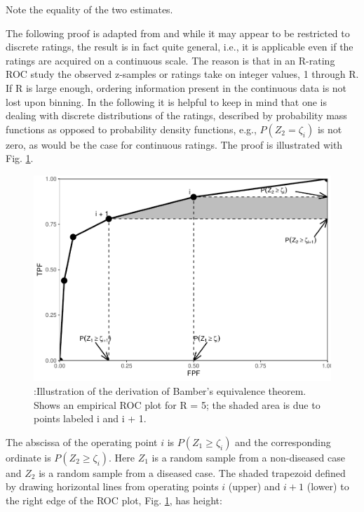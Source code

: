 \documentclass[
]{book}
\begin{document}
Note the equality of the two estimates.

The following proof is adapted from \citep{RN2174} and while it may appear to be restricted to discrete ratings, the result is in fact quite general, i.e., it is applicable even if the ratings are acquired on a continuous scale. The reason is that in an R-rating ROC study the observed z-samples or ratings take on integer values, 1 through R. If R is large enough, ordering information present in the continuous data is not lost upon binning. In the following it is helpful to keep in mind that one is dealing with discrete distributions of the ratings, described by probability mass functions as opposed to probability density functions, e.g., \(P(Z_2 = \zeta_i)\) is not zero, as would be the case for continuous ratings. The proof is illustrated with Fig. \ref{fig:empirical-AUC-BambersTheorem}.

\begin{figure}
\centering
\includegraphics{05-empirical-auc_files/figure-latex/empirical-AUC-BambersTheorem-1.pdf}
\caption{\label{fig:empirical-AUC-BambersTheorem}:Illustration of the derivation of Bamber's equivalence theorem. Shows an empirical ROC plot for R = 5; the shaded area is due to points labeled i and i + 1.}
\end{figure}

The abscissa of the operating point \(i\) is \(P(Z_1 \geq \zeta_i)\) and the corresponding ordinate is \(P(Z_2 \geq \zeta_i)\). Here \(Z_1\) is a random sample from a non-diseased case and \(Z_2\) is a random sample from a diseased case. The shaded trapezoid defined by drawing horizontal lines from operating points \(i\) (upper) and \(i+1\) (lower) to the right edge of the ROC plot, Fig. \ref{fig:empirical-AUC-BambersTheorem}, has height:
\end{document}
